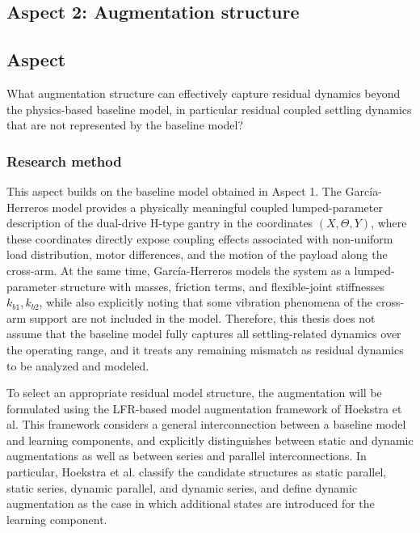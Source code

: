 \subsection{Aspect 2: Augmentation structure}

\subsection*{Aspect}
What augmentation structure can effectively capture residual dynamics beyond the physics-based baseline model, in particular residual coupled settling dynamics that are not represented by the baseline model?

\subsubsection{Research method}

This aspect builds on the baseline model obtained in Aspect 1. The García-Herreros model provides a physically meaningful coupled lumped-parameter description of the dual-drive H-type gantry in the coordinates $(X,\Theta,Y)$, where these coordinates directly expose coupling effects associated with non-uniform load distribution, motor differences, and the motion of the payload along the cross-arm. At the same time, García-Herreros models the system as a lumped-parameter structure with masses, friction terms, and flexible-joint stiffnesses $k_{b1},k_{b2}$, while also explicitly noting that some vibration phenomena of the cross-arm support are not included in the model. Therefore, this thesis does not assume that the baseline model fully captures all settling-related dynamics over the operating range, and it treats any remaining mismatch as residual dynamics to be analyzed and modeled.

To select an appropriate residual model structure, the augmentation will be formulated using the LFR-based model augmentation framework of Hoekstra et al. This framework considers a general interconnection between a baseline model and learning components, and explicitly distinguishes between static and dynamic augmentations as well as between series and parallel interconnections. In particular, Hoekstra et al. classify the candidate structures as static parallel, static series, dynamic parallel, and dynamic series, and define dynamic augmentation as the case in which additional states are introduced for the learning component.


